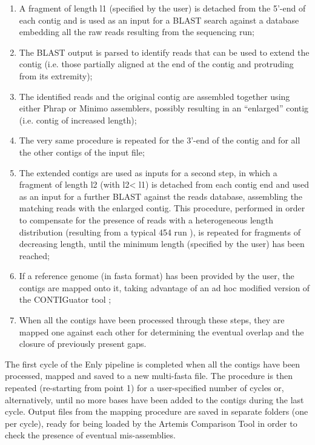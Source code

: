 \begin{enumerate}
\item A fragment of length l1 (specified by the user) is detached from the 5’-end of each contig and is used as an input for a BLAST search \cite{camacho2009blast+} against a database embedding all the raw reads resulting from the sequencing run;
\item The BLAST output is parsed to identify reads that can be used to extend the contig (i.e. those partially aligned at the end of the contig and protruding from its extremity);
\item The identified reads and the original contig are assembled together using either Phrap \cite{machado2011phred} or Minimo \cite{treangen2011next} assemblers, possibly resulting in an “enlarged” contig (i.e. contig of increased length);
\item The very same procedure is repeated for the 3’-end of the contig and for all the other contigs of the input file;
\item The extended contigs are used as inputs for a second step, in which a fragment of length l2 (with l2< l1) is detached from each contig end and used as an input for a further BLAST against the reads database, assembling the matching reads with the enlarged contig. This procedure, performed in order to compensate for the presence of reads with a heterogeneous length distribution (resulting from a typical 454 run \cite{margulies2005genome}), is repeated for fragments of decreasing length, until the minimum length (specified by the user) has been reached;
\item If a reference genome (in fasta format) has been provided by the user, the contigs are mapped onto it, taking advantage of an ad hoc modified version of the CONTIGuator tool \cite{galardini2011contiguator};
\item When all the contigs have been processed through these steps, they are mapped one against each other for determining the eventual overlap and the closure of previously present gaps.
\end{enumerate}
The first cycle of the Enly pipeline is completed when all the contigs have been processed, mapped and saved to a new multi-fasta file. The procedure is then repeated (re-starting from point 1) for a user-specified number of cycles or, alternatively, until no more bases have been added to the contigs during the last cycle. Output files from the mapping procedure are saved in separate folders (one per cycle), ready for being loaded by the Artemis Comparison Tool \cite{carver2005act} in order to check the presence of eventual mis-assemblies.

